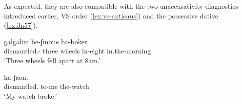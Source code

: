 \begin{exe}
\begin{xlist}
\begin{xlist}
\begin{exe}
\begin{xlist}
\begin{xlist}
\begin{exe}
\begin{xlist}
\begin{xlist}
\begin{exe}
\begin{exe}
\begin{xlist}
\begin{exe}
\begin{exe}
\begin{xlist}
\begin{exe}
\begin{exe}
\begin{exe}
\begin{exe}
\begin{exe}
\begin{xlist}
\begin{exe}
\begin{xlist}
\begin{exe}
\begin{exe}
\begin{xlist}
\begin{exe}
\begin{xlist}
\begin{exe}
\begin{xlist}
\begin{exe}
\begin{exe}
\begin{exe}
\begin{xlist}
\begin{exe}
\begin{exe}
\begin{exe}
\begin{xlist}
\begin{exe}
\begin{xlist}
\begin{exe}
\begin{xlist}
\begin{exe}
\begin{xlist}
\begin{exe}
\begin{exe}
\begin{exe}
\begin{exe}
\begin{xlist}
\begin{exe}
\begin{xlist}
\begin{exe}
\begin{xlist}
\begin{exe}
\begin{xlist}
\begin{exe}
\begin{xlist}
\begin{exe}
\begin{xlist}
\begin{exe}
\begin{exe}
\begin{exe}
\begin{exe}
\begin{xlist}
\begin{exe}
\begin{xlist}
\begin{exe}
\begin{xlist}
\begin{exe}
\begin{exe}
\begin{xlist}
\begin{exe}
\begin{xlist}
\begin{exe}
\begin{exe}
As expected, they are also compatible with the two unaccusativity diagnostics introduced earlier, VS order (\ref{ex:vs-anticaus}) and the possessive dative (\ref{ex:3n57}).
 \begin{exe}
\ex \label{ex:vs-anticaus}  
 { \gll {}  \underline{galgalim} be-ʃmone ba-boker.\\
 	  dismantled.- three wheels in-eight in.the-morning\\
 	\glt `Three wheels fell apart at 8am.' } 
	
 \ex  \label{ex:3n57}
 { \gll {}  ha-ʃaon.\\
   dismantled. to-me the-watch\\
 \glt `My watch broke.' } 

 \z 


\end{exe}
\end{exe}
\end{exe}
\end{xlist}
\end{exe}
\end{xlist}
\end{exe}
\end{exe}
\end{xlist}
\end{exe}
\end{xlist}
\end{exe}
\end{xlist}
\end{exe}
\end{exe}
\end{exe}
\end{exe}
\end{xlist}
\end{exe}
\end{xlist}
\end{exe}
\end{xlist}
\end{exe}
\end{xlist}
\end{exe}
\end{xlist}
\end{exe}
\end{xlist}
\end{exe}
\end{exe}
\end{exe}
\end{exe}
\end{xlist}
\end{exe}
\end{xlist}
\end{exe}
\end{xlist}
\end{exe}
\end{xlist}
\end{exe}
\end{exe}
\end{exe}
\end{xlist}
\end{exe}
\end{exe}
\end{exe}
\end{xlist}
\end{exe}
\end{xlist}
\end{exe}
\end{xlist}
\end{exe}
\end{exe}
\end{xlist}
\end{exe}
\end{xlist}
\end{exe}
\end{exe}
\end{exe}
\end{exe}
\end{exe}
\end{xlist}
\end{exe}
\end{exe}
\end{xlist}
\end{exe}
\end{exe}
\end{xlist}
\end{xlist}
\end{exe}
\end{xlist}
\end{xlist}
\end{exe}
\end{xlist}
\end{xlist}
\end{exe}
